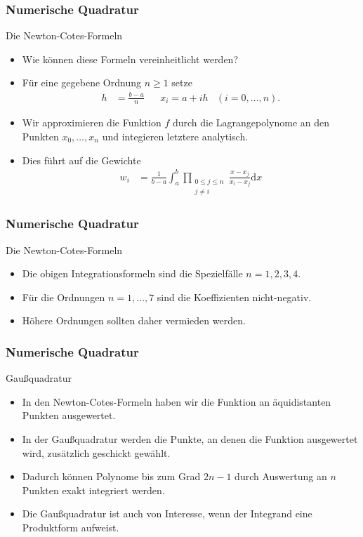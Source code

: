\documentclass{beamer}
\newcommand\dd{\mathrm d}
\renewcommand{\ae}{\"a}
\renewcommand{\oe}{\"o}
\newcommand{\ue}{\"u}
\newcommand{\mytitle}{Numerische Quadratur}
\begin{document}
\begin{frame}\frametitle{\mytitle}
	\begin{block}{Die Newton-Cotes-Formeln}
		\begin{itemize}
			\item Wie k\oe nnen diese Formeln vereinheitlicht werden?
			\item F\ue r eine gegebene Ordnung $n\geq1$ setze
				\begin{align*}
					h&=\frac{b-a}{n}&&x_i=a+ih&(i=0,\ldots,n).
				\end{align*}
			\item Wir approximieren die Funktion $f$ durch die Lagrangepolynome an den Punkten $x_0,\ldots,x_n$ und integieren letztere analytisch.
			\item Dies f\ue hrt auf die Gewichte
				\begin{align*}
					w_i&=\frac{1}{b-a}\int_a^b\prod_{\substack{0\leq j\leq n\\j\neq i}}\frac{x-x_j}{x_i-x_j}\dd x
				\end{align*}
		\end{itemize}
	\end{block}
\end{frame}

\begin{frame}\frametitle{\mytitle}
	\begin{block}{Die Newton-Cotes-Formeln}
		\begin{itemize}
			\item Die obigen Integrationsformeln sind die Spezielf\ae lle $n=1,2,3,4$.
			\item F\ue r die Ordnungen $n=1,\ldots,7$ sind die Koeffizienten nicht-negativ.
			\item H\oe here Ordnungen sollten daher vermieden werden.
		\end{itemize}
	\end{block}
\end{frame}

\begin{frame}\frametitle{\mytitle}
	\begin{block}{Gau\ss quadratur}
		\begin{itemize}
			\item In den Newton-Cotes-Formeln haben wir die Funktion an \ae quidistanten Punkten ausgewertet.
			\item In der Gau\ss quadratur werden die Punkte, an denen die Funktion ausgewertet wird, zus\ae tzlich geschickt gew\ae hlt.
			\item Dadurch k\oe nnen Polynome bis zum Grad $2n-1$ durch Auswertung an $n$ Punkten exakt integriert werden.
			\item Die Gau\ss quadratur ist auch von Interesse, wenn der Integrand eine Produktform aufweist.
		\end{itemize}
	\end{block}
\end{frame}
\end{document}
